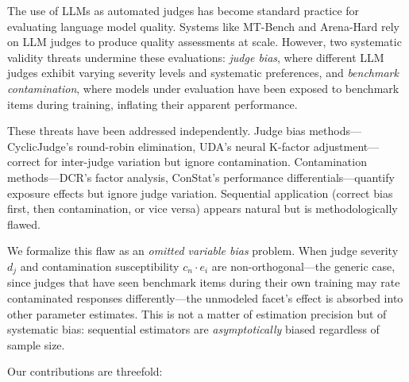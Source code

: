 \documentclass[11pt]{article}
\newcommand{\cn}{c_n}
\newcommand{\ei}{e_i}
\renewcommand{\dj}{d_j}
\begin{document}
The use of LLMs as automated judges has become standard practice for evaluating language model quality. Systems like MT-Bench and Arena-Hard rely on LLM judges to produce quality assessments at scale. However, two systematic validity threats undermine these evaluations: \emph{judge bias}, where different LLM judges exhibit varying severity levels and systematic preferences, and \emph{benchmark contamination}, where models under evaluation have been exposed to benchmark items during training, inflating their apparent performance.

These threats have been addressed independently. Judge bias methods---CyclicJudge's round-robin elimination, UDA's neural K-factor adjustment---correct for inter-judge variation but ignore contamination. Contamination methods---DCR's factor analysis, ConStat's performance differentials---quantify exposure effects but ignore judge variation. Sequential application (correct bias first, then contamination, or vice versa) appears natural but is methodologically flawed.

We formalize this flaw as an \emph{omitted variable bias} problem. When judge severity $\dj$ and contamination susceptibility $\cn \cdot \ei$ are non-orthogonal---the generic case, since judges that have seen benchmark items during their own training may rate contaminated responses differently---the unmodeled facet's effect is absorbed into other parameter estimates. This is not a matter of estimation precision but of systematic bias: sequential estimators are \emph{asymptotically} biased regardless of sample size.

Our contributions are threefold:
\end{document}
